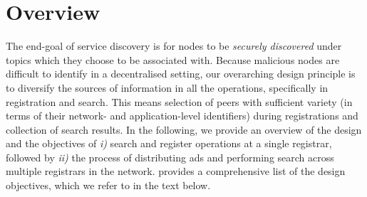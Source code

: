 
\section{Overview}
\label{sec:overview}

The end-goal of service discovery is for nodes to be \textit{securely discovered} under topics which they choose to be associated with. Because malicious nodes are difficult to identify in a decentralised setting, our overarching design principle is to diversify the sources of information in all the operations, specifically in registration and search. This means selection of peers with sufficient variety (in terms of their network- and application-level identifiers) during registrations and collection of search results. In the following, we provide an overview of the design and the objectives of \textit{i)} search and register operations at a single registrar, followed by \textit{ii)} the process of distributing ads and performing search across multiple registrars in the network. 
 provides a comprehensive list of the design objectives, which we refer to in the text below.


